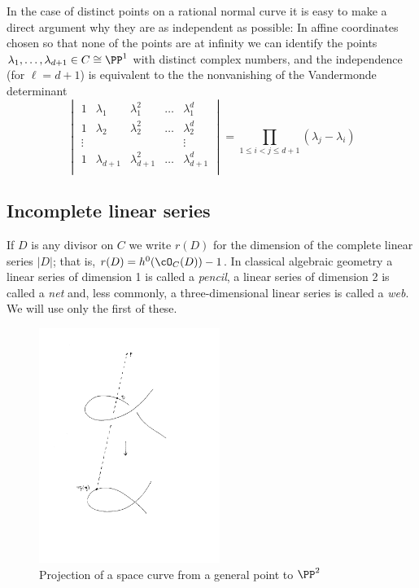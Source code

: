 In the case of distinct points on a rational normal curve
it is easy to make a direct argument why they are as independent as possible: In affine coordinates chosen so that none of the points are
at infinity we can identify the points $\lambda_1,\dots,\lambda_{d+1} \in C \cong \PP^1$ with distinct complex numbers, and the independence (for $\ell = d+1$) is equivalent to the the nonvanishing of the Vandermonde determinant
$$
\begin{vmatrix}
1 & \lambda_1 & \lambda_1^2 & \dots & \lambda_1^d \\
1 & \lambda_2 & \lambda_2^2 & \dots & \lambda_2^d \\
\vdots & & & & \vdots \\
1 & \lambda_{d+1} & \lambda_{d+1}^2 & \dots & \lambda_{d+1}^d \\
\end{vmatrix}
= \prod_{1 \leq i < j \leq d+1} (\lambda_j - \lambda_i)
$$


\subsection{Incomplete linear series}

 If $D$ is any divisor on $C$ we write $r(D)$ for the dimension of the complete linear series $|D|$; that is, $r(D) = h^0(\cO_C(D)) - 1$. In classical algebraic geometry a linear series of dimension 1 is called a \emph{pencil}, a linear series of dimension 2 is called a \emph{net} and, less commonly, a three-dimensional linear series is called a \emph{web}.  We will use only the first of these.

\begin{figure}
 \caption{Projection of a space curve from a general point to $\PP^2$}
\centerline {\includegraphics[height=3in]{"Fig1.2.pdf"}}
\end{figure}

